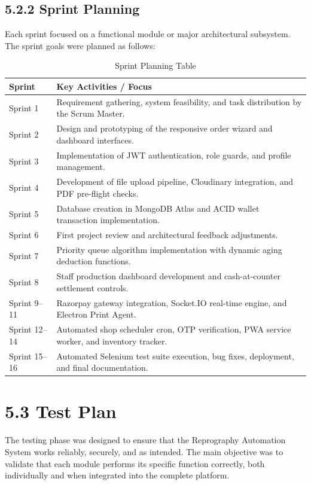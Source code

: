 \documentclass[12pt,a4paper]{report}
\begin{document}
\subsection{5.2.2 Sprint Planning}
Each sprint focused on a functional module or major architectural subsystem. The sprint goals were planned as follows:

\begin{table}[H]
\centering
\small
\caption{Sprint Planning Table}
\label{tab:sprint}
\begin{tabular}{|p{0.8in}|p{4.6in}|}
\hline
\textbf{Sprint} & \textbf{Key Activities / Focus} \\ \hline
Sprint 1 & Requirement gathering, system feasibility, and task distribution by the Scrum Master. \\ \hline
Sprint 2 & Design and prototyping of the responsive order wizard and dashboard interfaces. \\ \hline
Sprint 3 & Implementation of JWT authentication, role guards, and profile management. \\ \hline
Sprint 4 & Development of file upload pipeline, Cloudinary integration, and PDF pre-flight checks. \\ \hline
Sprint 5 & Database creation in MongoDB Atlas and ACID wallet transaction implementation. \\ \hline
Sprint 6 & First project review and architectural feedback adjustments. \\ \hline
Sprint 7 & Priority queue algorithm implementation with dynamic aging deduction functions. \\ \hline
Sprint 8 & Staff production dashboard development and cash-at-counter settlement controls. \\ \hline
Sprint 9--11 & Razorpay gateway integration, Socket.IO real-time engine, and Electron Print Agent. \\ \hline
Sprint 12--14 & Automated shop scheduler cron, OTP verification, PWA service worker, and inventory tracker. \\ \hline
Sprint 15--16 & Automated Selenium test suite execution, bug fixes, deployment, and final documentation. \\ \hline
\end{tabular}
\end{table}

\section{5.3 Test Plan}
The testing phase was designed to ensure that the Reprography Automation System works reliably, securely, and as intended. The main objective was to validate that each module performs its specific function correctly, both individually and when integrated into the complete platform.
\end{document}
